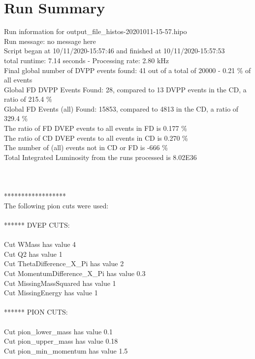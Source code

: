 \documentclass{article}
\begin{document}
\section{Run Summary}

	Run information for output\_file\_histos-20201011-15-57.hipo 
\\Run message: no message here  
\\Script began at 10/11/2020-15:57:46 and finished at 10/11/2020-15:57:53
\\total runtime: 7.14 seconds - Processing rate: 2.80 kHz 
\\Final global number of DVPP events found: 41 out of a total of 20000 - 0.21 \% of all events
\\Global FD DVPP Events Found: 28, compared to 13 DVPP events in the CD, a ratio of 215.4 \%
\\Global FD Events (all) Found: 15853, compared to 4813 in the CD, a ratio of 329.4 \%
\\The ratio of FD DVEP events to all events in FD is  0.177 \%
\\The ratio of CD DVEP events to all events in CD is  0.270 \%
\\The number of (all) events not in CD or FD is  -666 \%
\\Total Integrated Luminosity from the runs processed is 8.02E36 
\\
\\ 
\\
\\****************** 
\\ The following pion cuts were used: 
\\
\\ ****** DVEP CUTS: 
\\ 
\\Cut WMass has value 4 
\\Cut Q2 has value 1 
\\Cut ThetaDifference\_X\_Pi has value 2 
\\Cut MomentumDifference\_X\_Pi has value 0.3 
\\Cut MissingMassSquared has value 1 
\\Cut MissingEnergy has value 1 
\\
\\ ****** PION CUTS: 
\\ 
\\Cut pion\_lower\_mass has value 0.1 
\\Cut pion\_upper\_mass has value 0.18 
\\Cut pion\_min\_momentum has value 1.5 
\end{document}
